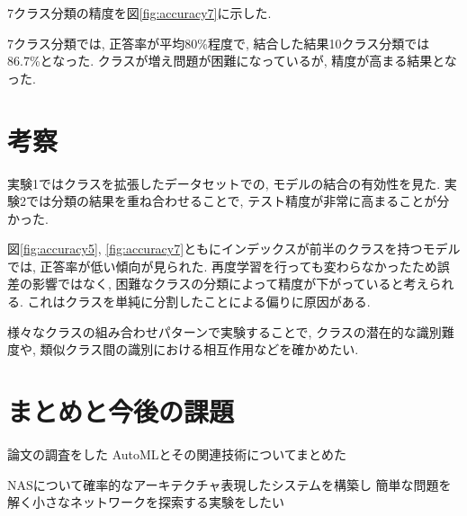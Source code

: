 \documentclass[twocolumn]{jarticle}     %
\begin{document}
7クラス分類の精度を図\ref{fig:accuracy7}に示した.

7クラス分類では, 正答率が平均80\%程度で, 結合した結果10クラス分類では86.7\%となった.
クラスが増え問題が困難になっているが, 精度が高まる結果となった.

\section{考察}

実験1ではクラスを拡張したデータセットでの, モデルの結合の有効性を見た.
実験2では分類の結果を重ね合わせることで, テスト精度が非常に高まることが分かった.

図\ref{fig:accuracy5}, \ref{fig:accuracy7}ともにインデックスが前半のクラスを持つモデルでは, 正答率が低い傾向が見られた. 再度学習を行っても変わらなかったため誤差の影響ではなく, 困難なクラスの分類によって精度が下がっていると考えられる. これはクラスを単純に分割したことによる偏りに原因がある.

様々なクラスの組み合わせパターンで実験することで, クラスの潜在的な識別難度や, 類似クラス間の識別における相互作用などを確かめたい.

\section{まとめと今後の課題}
論文の調査をした
AutoMLとその関連技術についてまとめた

NASについて確率的なアーキテクチャ表現したシステムを構築し
簡単な問題を解く小さなネットワークを探索する実験をしたい



\end{document}
